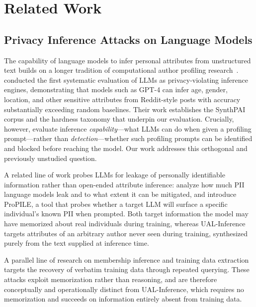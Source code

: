 \section{Related Work}
\label{sec:related}

\subsection{Privacy Inference Attacks on Language Models}

The capability of language models to infer personal attributes from unstructured text builds on a longer tradition of computational author profiling research~\citep{koppel2002automatically,rangel2013overview,estival2007author}.
\citet{staab2024beyond} conducted the first systematic evaluation of LLMs as privacy-violating inference engines, demonstrating that models such as GPT-4 can infer age, gender, location, and other sensitive attributes from Reddit-style posts with accuracy substantially exceeding random baselines. Their work establishes the SynthPAI corpus and the hardness taxonomy that underpin our evaluation. Crucially, however, \citet{staab2024beyond} evaluate inference \emph{capability}---what LLMs can do when given a profiling prompt---rather than \emph{detection}---whether such profiling prompts can be identified and blocked before reaching the model. Our work addresses this orthogonal and previously unstudied question.

A related line of work probes LLMs for leakage of personally identifiable information rather than open-ended attribute inference: \citet{lukas2023analyzing} analyze how much PII language models leak and to what extent it can be mitigated, and \citet{kim2023propile} introduce ProPILE, a tool that probes whether a target LLM will surface a specific individual's known PII when prompted. Both target information the model may have memorized about real individuals during training, whereas UAL-Inference targets attributes of an arbitrary author never seen during training, synthesized purely from the text supplied at inference time.

A parallel line of research on membership inference and training data extraction~\cite{carlini2021extracting} targets the recovery of verbatim training data through repeated querying. These attacks exploit memorization rather than reasoning, and are therefore conceptually and operationally distinct from UAL-Inference, which requires no memorization and succeeds on information entirely absent from training data.

